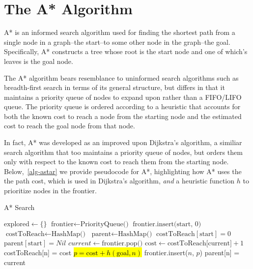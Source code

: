 \documentclass[12pt, conference, compsocconf]{IEEEtran}
\begin{document}
\section{The A* Algorithm}
A* is an informed search algorithm used for finding the shortest path from a
single node in a graph--the start--to some other node in the graph--the goal.
Specifically, A* constructs a tree whose root is the start node and one of
which's leaves is the goal node.

The A* algorithm bears resemblance to uninformed search algorithms such as
breadth-first search in terms of its general structure, but differs in that it
maintains a priority queue of nodes to expand upon rather than a FIFO/LIFO
queue.  The priority queue is ordered according to a heuristic that accounts
for both the known cost to reach a node from the starting node and the
estimated cost to reach the goal node from that node.

In fact, A* was developed as an improved upon Dijkstra's algorithm, a similiar
search algorithm that too maintains a priority queue of nodes, but orders them
only with respect to the known cost to reach them from the starting node.
Below,~\ref{alg-astar} we provide pseudocode for A*, highlighting how A* uses 
the the path cost, which is used in Dijkstra's algorithm, \emph{and} a heuristic 
function $h$ to prioritize nodes in the frontier. 

\begin{algorithm}
    \caption{A* Search}
    \label{alg-astar}
    \begin{algorithmic}[1]
            \State $\text{explored} \gets \{\}$
            \State $\text{frontier} \gets \text{PriorityQueue()}$
            \State $\text{frontier.insert(start, 0)}$
            \State $\text{costToReach} \gets \text{HashMap()}$
            \State $\text{parent} \gets \text{HashMap()}$
            \State $\text{costToReach}[\text{start}] = 0$
            \State $\text{parent}[\text{start}] = Nil$
                \State $current \gets \text{frontier.pop()}$
                \Else
                        \State $\text{cost} \gets \text{costToReach[current]} + 1$
                                \State costToReach[n] = cost
                                \State \hl{$p = \text{cost} + h(\text{goal}, n)$}
                                \State frontier.insert($n$, $p$)
                                \State parent[n] = current
                            \EndIf
                        \EndFor
                \EndIf
            \EndWhile
        \State {}
        \EndFunction
    \end{algorithmic}
\end{algorithm}
\end{document}
